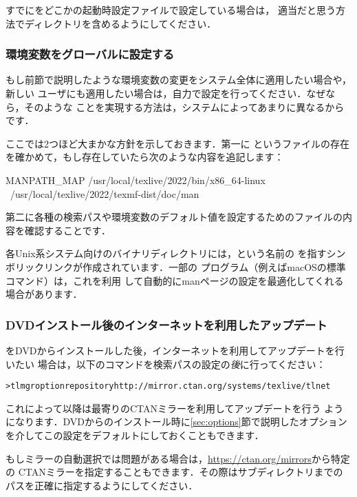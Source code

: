 \documentclass[uplatex,dvipdfmx,tombow]{jsarticle}
\begin{document}
すでにをどこかの起動時設定ファイルで設定している場合は，
適当だと思う方法で\TL ディレクトリを含めるようにしてください．

\subsubsection{環境変数をグローバルに設定する}
\label{sec:envglobal}

もし前節で説明したような環境変数の変更をシステム全体に適用したい場合や，新しい
ユーザにも適用したい場合は，自力で設定を行ってください．なぜなら，そのような
ことを実現する方法は，システムによってあまりに異なるからです．

ここでは2つほど大まかな方針を示しておきます．第一に%
というファイルの存在を確かめて，もし存在していたら次のような内容を追記します：
%
\begin{sverbatim}
MANPATH_MAP /usr/local/texlive/2022/bin/x86_64-linux \
            /usr/local/texlive/2022/texmf-dist/doc/man
\end{sverbatim}
%
第二に各種の検索パスや環境変数のデフォルト値を設定するためのファイルの内容を確認することです．

各Unix系システム向けのバイナリディレクトリには，という名前の
を指すシンボリックリンクが作成されています．一部の
プログラム（例えばmacOSの標準コマンド）は，これを利用
して自動的にmanページの設定を最適化してくれる場合があります．

\subsubsection{DVDインストール後のインターネットを利用したアップデート}
\label{sec:dvd-install-net-updates}

\TL をDVDからインストールした後，インターネットを利用してアップデートを行いたい
場合は，以下のコマンドを検索パスの設定の\emph{後}に行ってください：
%
\begin{alltt}
> tlmgr option repository http://mirror.ctan.org/systems/texlive/tlnet
\end{alltt}
%
これによって以降は最寄りのCTANミラーを利用してアップデートを行う
ようになります．DVDからのインストール時に\ref{sec:options}節で説明したオプション
を介してこの設定をデフォルトにしておくこともできます．

もしミラーの自動選択では問題がある場合は，\url{https://ctan.org/mirrors}から特定の
CTANミラーを指定することもできます．その際はサブディレクトリまでの
パスを正確に指定するようにしてください．
\end{document}

